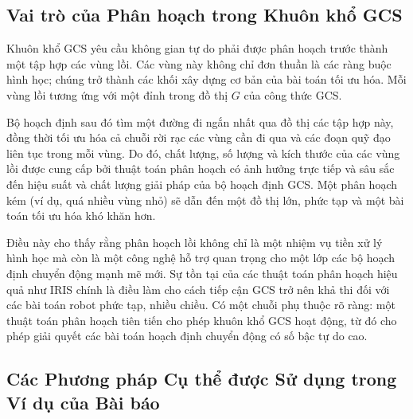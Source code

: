 \documentclass{article}
\begin{document}
\subsection{Vai trò của Phân hoạch trong Khuôn khổ GCS}

Khuôn khổ GCS yêu cầu không gian tự do phải được phân hoạch trước thành một tập hợp các vùng lồi. Các vùng này không chỉ đơn thuần là các ràng buộc hình học; chúng trở thành các khối xây dựng cơ bản của bài toán tối ưu hóa. Mỗi vùng lồi tương ứng với một đỉnh trong đồ thị $G$ của công thức GCS.\cite{motionplanning2022}

Bộ hoạch định sau đó tìm một đường đi ngắn nhất qua đồ thị các tập hợp này, đồng thời tối ưu hóa cả chuỗi rời rạc các vùng cần đi qua và các đoạn quỹ đạo liên tục trong mỗi vùng.  Do đó, chất lượng, số lượng và kích thước của các vùng lồi được cung cấp bởi thuật toán phân hoạch có ảnh hưởng trực tiếp và sâu sắc đến hiệu suất và chất lượng giải pháp của bộ hoạch định GCS. Một phân hoạch kém (ví dụ, quá nhiều vùng nhỏ) sẽ dẫn đến một đồ thị lớn, phức tạp và một bài toán tối ưu hóa khó khăn hơn.

Điều này cho thấy rằng phân hoạch lồi không chỉ là một nhiệm vụ tiền xử lý hình học mà còn là một công nghệ hỗ trợ quan trọng cho một lớp các bộ hoạch định chuyển động mạnh mẽ mới. Sự tồn tại của các thuật toán phân hoạch hiệu quả như IRIS chính là điều làm cho cách tiếp cận GCS trở nên khả thi đối với các bài toán robot phức tạp, nhiều chiều. Có một chuỗi phụ thuộc rõ ràng: một thuật toán phân hoạch tiên tiến cho phép khuôn khổ GCS hoạt động, từ đó cho phép giải quyết các bài toán hoạch định chuyển động có số bậc tự do cao.

\subsection{Các Phương pháp Cụ thể được Sử dụng trong Ví dụ của Bài báo}
\end{document}
